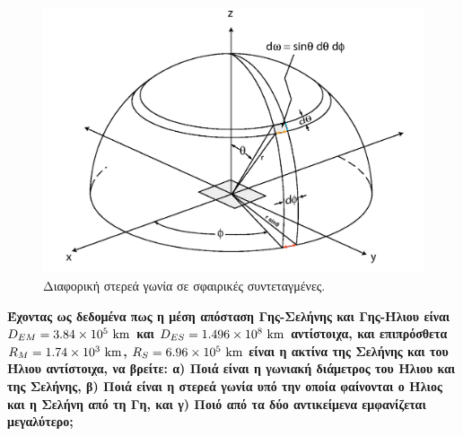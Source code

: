 \begin{figure}[h]
    \centering
    \includegraphics[scale=0.3]{Figures/diferential_solid_angle.png}
    \caption{Διαφορική στερεά γωνία σε σφαιρικές συντεταγμένες.}
    \label{fig:diff_solid_angle}
\end{figure}

\textbf{Έχοντας ως δεδομένα πως η μέση απόσταση Γης-Σελήνης και Γης-Ήλιου είναι $D_{EM} = 3.84 \times 10^5 \ \rm km$ και $D_{ES} = 1.496 \times 10^8 \ \rm km$ αντίστοιχα, και επιπρόσθετα $R_M = 1.74 \times 10^3 \ \rm km$, $R_S = 6.96 \times 10^5 \ \rm km$ είναι η ακτίνα της Σελήνης και του Ήλιου αντίστοιχα, να βρείτε: α) Ποιά είναι η γωνιακή διάμετρος του Ήλιου και της Σελήνης, β) Ποιά είναι η στερεά γωνία υπό την οποία φαίνονται ο Ήλιος και η Σελήνη από τη Γη, και γ) Ποιό από τα δύο αντικείμενα εμφανίζεται μεγαλύτερο;}

